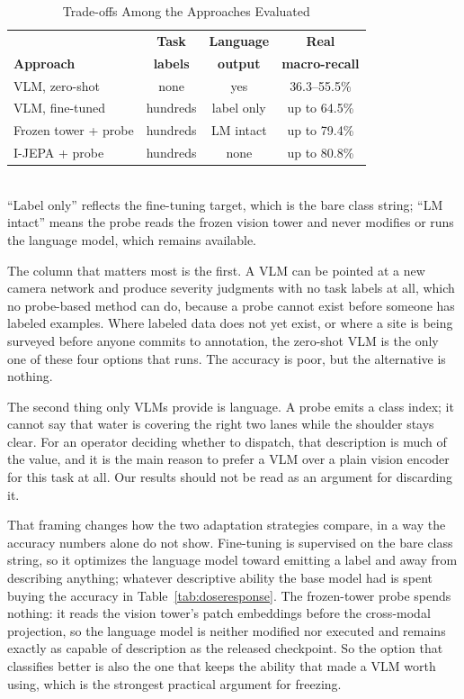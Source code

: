 \documentclass[conference]{IEEEtran}
\begin{document}
\begin{table}[t]
\caption{Trade-offs Among the Approaches Evaluated}
\label{tab:tradeoffs}
\centering
\begin{tabular}{lccc}
\toprule
 & \textbf{Task} & \textbf{Language} & \textbf{Real} \\
\textbf{Approach} & \textbf{labels} & \textbf{output} & \textbf{macro-recall} \\
\midrule
VLM, zero-shot        & none & yes & 36.3--55.5\% \\
VLM, fine-tuned       & hundreds & label only & up to 64.5\% \\
Frozen tower + probe  & hundreds & LM intact & up to 79.4\% \\
I-JEPA + probe        & hundreds & none & up to 80.8\% \\
\bottomrule
\end{tabular}
\\[2pt]
{\footnotesize ``Label only'' reflects the fine-tuning target, which is the bare class string; ``LM intact'' means the probe reads the frozen vision tower and never modifies or runs the language model, which remains available.}
\end{table}

The column that matters most is the first. A VLM can be pointed at a new camera network and produce severity judgments with no task labels at all, which no probe-based method can do, because a probe cannot exist before someone has labeled examples. Where labeled data does not yet exist, or where a site is being surveyed before anyone commits to annotation, the zero-shot VLM is the only one of these four options that runs. The accuracy is poor, but the alternative is nothing.

The second thing only VLMs provide is language. A probe emits a class index; it cannot say that water is covering the right two lanes while the shoulder stays clear. For an operator deciding whether to dispatch, that description is much of the value, and it is the main reason to prefer a VLM over a plain vision encoder for this task at all. Our results should not be read as an argument for discarding it.

That framing changes how the two adaptation strategies compare, in a way the accuracy numbers alone do not show. Fine-tuning is supervised on the bare class string, so it optimizes the language model toward emitting a label and away from describing anything; whatever descriptive ability the base model had is spent buying the accuracy in Table~\ref{tab:doseresponse}. The frozen-tower probe spends nothing: it reads the vision tower's patch embeddings before the cross-modal projection, so the language model is neither modified nor executed and remains exactly as capable of description as the released checkpoint. So the option that classifies better is also the one that keeps the ability that made a VLM worth using, which is the strongest practical argument for freezing.
\end{document}
